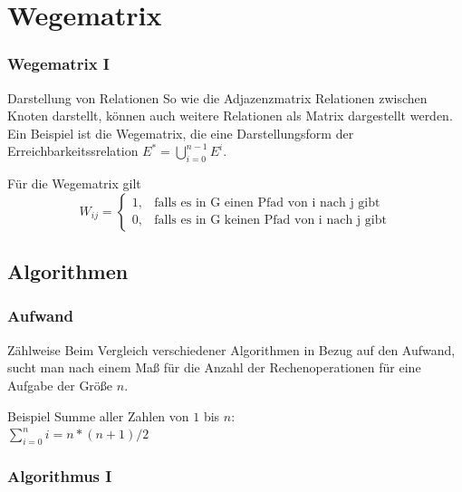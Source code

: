 
\section{Wegematrix}
\begin{frame}
	\frametitle{Wegematrix I}
	\begin{block}{Darstellung von Relationen}
		So wie die Adjazenzmatrix Relationen zwischen Knoten darstellt, können auch weitere Relationen als Matrix dargestellt werden. Ein Beispiel ist die Wegematrix, die eine Darstellungsform der Erreichbarkeitssrelation
		$E^*=\bigcup^{n-1}_{i=0} E^i $. \\
	\end{block}
	\begin{block}{Für die Wegematrix gilt}
 \begin{displaymath}
 W_{ij}=
	\begin{cases}
		1, & \text{falls es in G einen Pfad von i nach j gibt} \\
		0, & \text{falls es in G keinen Pfad von i nach j gibt}
	\end{cases}
	\end{displaymath}
	\end{block}
\end{frame}

\subsection{Algorithmen}
\begin{frame}
	\frametitle{Aufwand}
	\begin{block}{Zählweise}
		Beim Vergleich verschiedener Algorithmen in Bezug auf den Aufwand, sucht man nach einem Maß für die Anzahl der Rechenoperationen für eine Aufgabe der Größe $n$.
	\end{block}
	\begin{block}{Beispiel} \pause
		Summe aller Zahlen von $1$ bis $n$: \\

			$\sum^n_{i=0} i = $\pause$n*(n+1)/2$

	\end{block}
\end{frame}

\begin{frame}
	\frametitle{Algorithmus I}



\end{frame}

